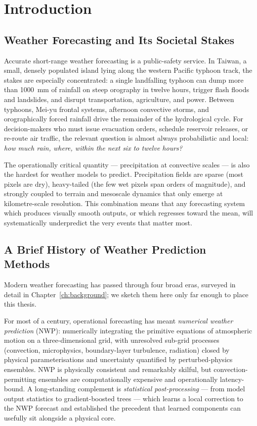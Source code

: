 
\chapter{Introduction}
\label{ch:introduction}

\section{Weather Forecasting and Its Societal Stakes}
\label{sec:intro-motivation}

Accurate short-range weather forecasting is a public-safety service. In Taiwan, a small, densely populated island lying along the western Pacific typhoon track, the stakes are especially concentrated: a single landfalling typhoon can dump more than \SI{1000}{\milli\metre} of rainfall on steep orography in twelve hours, trigger flash floods and landslides, and disrupt transportation, agriculture, and power. Between typhoons, Mei-yu frontal systems, afternoon convective storms, and orographically forced rainfall drive the remainder of the hydrological cycle. For decision-makers who must issue evacuation orders, schedule reservoir releases, or re-route air traffic, the relevant question is almost always probabilistic and local: \emph{how much rain, where, within the next six to twelve hours?}

The operationally critical quantity --- precipitation at convective scales --- is also the hardest for weather models to predict. Precipitation fields are sparse (most pixels are dry), heavy-tailed (the few wet pixels span orders of magnitude), and strongly coupled to terrain and mesoscale dynamics that only emerge at kilometre-scale resolution. This combination means that any forecasting system which produces visually smooth outputs, or which regresses toward the mean, will systematically underpredict the very events that matter most.

\section{A Brief History of Weather Prediction Methods}
\label{sec:intro-history}

Modern weather forecasting has passed through four broad eras, surveyed in detail in Chapter~\ref{ch:background}; we sketch them here only far enough to place this thesis.

For most of a century, operational forecasting has meant \emph{numerical weather prediction} (NWP): numerically integrating the primitive equations of atmospheric motion on a three-dimensional grid, with unresolved sub-grid processes (convection, microphysics, boundary-layer turbulence, radiation) closed by physical parameterisations and uncertainty quantified by perturbed-physics ensembles. NWP is physically consistent and remarkably skilful, but convection-permitting ensembles are computationally expensive and operationally latency-bound. A long-standing complement is \emph{statistical post-processing} --- from model output statistics to gradient-boosted trees --- which learns a local correction to the NWP forecast and established the precedent that learned components can usefully sit alongside a physical core.

